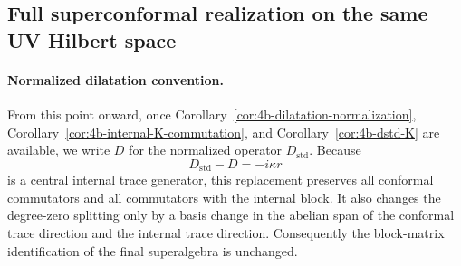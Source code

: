 \subsection{Full superconformal realization on the same UV Hilbert space}
\label{subsec:4b-superconf}

\paragraph{Normalized dilatation convention.}
From this point onward, once Corollary~\ref{cor:4b-dilatation-normalization},
Corollary~\ref{cor:4b-internal-K-commutation}, and
Corollary~\ref{cor:4b-dstd-K} are available, we write \(D\) for the normalized
operator \(D_{\mathrm{std}}\). Because
\[
  D_{\mathrm{std}}-D=-i\kappa r
\]
is a central internal trace generator, this replacement preserves all conformal
commutators and all commutators with the internal block. It also changes the
degree-zero splitting only by a basis change in the abelian span of the
conformal trace direction and the internal trace direction. Consequently the
block-matrix identification of the final superalgebra is unchanged.

